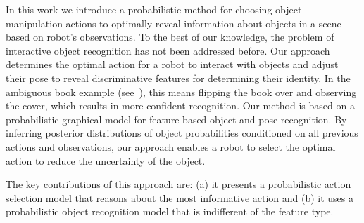 In this work we introduce a probabilistic method for choosing object manipulation actions to optimally reveal information about objects in a scene based on robot's observations.
To the best of our knowledge, the problem of interactive object recognition has not been addressed before. 
Our approach determines the optimal action for a robot to interact with objects and adjust their pose to reveal discriminative features for determining their identity.
In the ambiguous book example (see~), this means flipping the book over and observing the cover, which results in more confident recognition.
Our method is based on a probabilistic graphical model for feature-based object and pose recognition.
By inferring posterior distributions of object probabilities conditioned on all previous actions and observations, our approach enables a robot to select the optimal action to reduce the uncertainty of the object.

The key contributions of this approach are: (a) it presents a probabilistic action selection model that reasons about the most informative action and (b) it uses a probabilistic object recognition model that is indifferent of the feature type.



